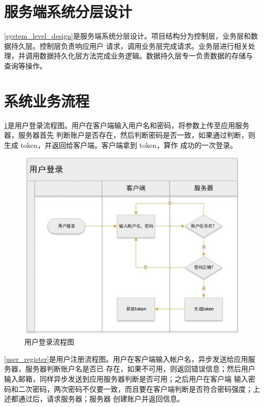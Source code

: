 \section{服务端系统分层设计}
\cref{system_level_design}是服务端系统分层设计。项目结构分为控制层，业务层和数据持久层。控制层负责响应用户
请求，调用业务层完成请求。业务层进行相关处理，并调用数据持久化层方法完成业务逻辑。数据持久层专一负责数据的存储与
查询等操作。

\section{系统业务流程}

\cref{user_login}是用户登录流程图。用户在客户端输入用户名和密码，将参数上传至应用服务器，服务器首先
判断账户是否存在，然后判断密码是否一致，如果通过判断，则生成 token，并返回给客户端。客户端拿到 token，算作
成功的一次登录。

\begin{figure}[h]
	\centering
	\includegraphics[scale=1]{Chapters/UML/user_login.jpg}
	\caption{用户登录流程图}
	\label{user_login}
\end{figure}

\cref{user_register}是用户注册流程图。用户在客户端输入帐户名，异步发送给应用服务器，服务器判断账户名是否已
存在，如果不可用，则返回错误信息；然后用户输入邮箱，同样异步发送到应用服务器判断是否可用；之后用户在客户端
输入密码和二次密码，两次密码不仅要一致，而且要在客户端判断是否符合密码强度；上述都通过后，请求服务器；服务器
创建账户并返回信息。
	
